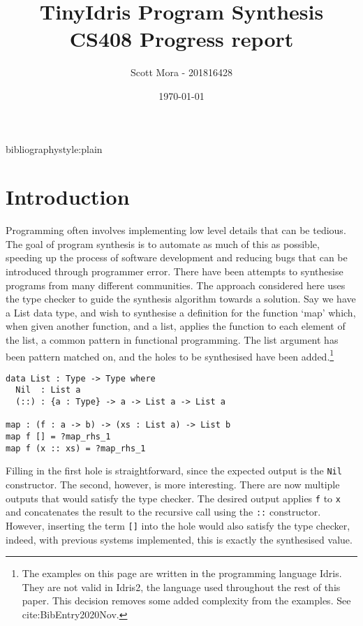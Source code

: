 \documentclass[a4paper]{article}
\author{Scott Mora - 201816428}
\date{\today}
\title{TinyIdris Program Synthesis\\\medskip
\large CS408 Progress report}
\begin{document}
\maketitle
bibliographystyle:plain

\section{Introduction}
\label{sec:org4e4495f}

Programming often involves implementing low level details that can be tedious.
The goal of program synthesis is to automate as much of this as possible, speeding up the process
of software development and reducing bugs that can be introduced through programmer error. 
There have been attempts to synthesise programs from many different communities.
The approach considered here uses the type checker to guide the synthesis algorithm 
towards a solution. Say we have a List data type, and wish to synthesise a definition for the function `map' which,
when given another function, and a list, applies the function to each element of the list, a common pattern in
functional programming. The list argument has been pattern matched on, and the holes to be synthesised
have been added.\footnote{The examples on this page are written in the programming language Idris. They are not valid in Idris2, the language used throughout the
rest of this paper. This decision removes some added complexity from the examples. See cite:BibEntry2020Nov.}

\begin{center}
\begin{verbatim}
data List : Type -> Type where
  Nil  : List a
  (::) : {a : Type} -> a -> List a -> List a

map : (f : a -> b) -> (xs : List a) -> List b 
map f [] = ?map_rhs_1
map f (x :: xs) = ?map_rhs_1
\end{verbatim}
\end{center}

Filling in the first hole is straightforward, since the expected output is the \texttt{Nil} constructor. The second, however,
is more interesting. There are now multiple outputs that would satisfy the type checker. The desired output applies
\texttt{f} to \texttt{x} and concatenates the result to the recursive call using the \texttt{::} constructor. 
However, inserting the term \texttt{[]} into the hole would also satisfy the type checker, indeed,
with previous systems implemented, this is exactly the synthesised value. 
\end{document}
